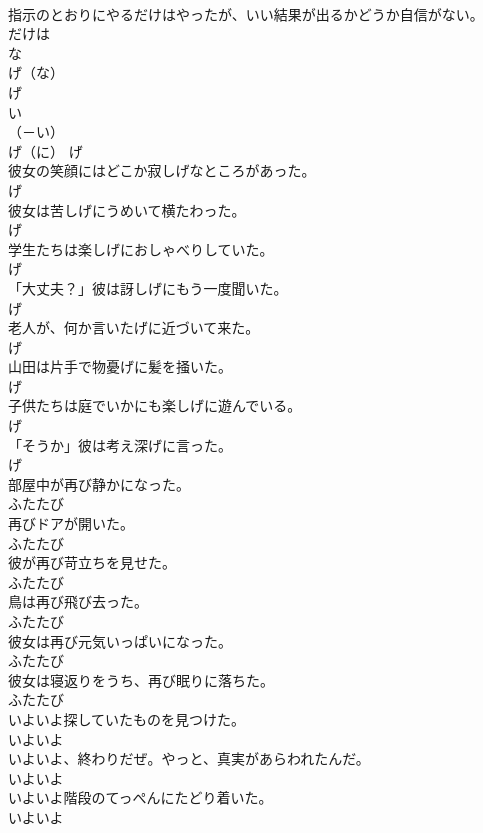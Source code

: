 \documentclass[8pt]{extreport}
\begin{document}
\begin{CJK}{UTF8}{min}
\\	指示のとおりにやるだけはやったが、いい結果が出るかどうか自信がない。	
\\	だけは
\\	な
\\	げ（な）	
\\	げ	
\\	い
\\	（－い） 
\\	げ（に）	げ
\\	彼女の笑顔にはどこか寂しげなところがあった。	
\\	げ
\\	彼女は苦しげにうめいて横たわった。	
\\	げ
\\	学生たちは楽しげにおしゃべりしていた。	
\\	げ
\\	「大丈夫？」彼は訝しげにもう一度聞いた。	
\\	げ
\\	老人が、何か言いたげに近づいて来た。	
\\	げ
\\	山田は片手で物憂げに髪を掻いた。	
\\	げ
\\	子供たちは庭でいかにも楽しげに遊んでいる。	
\\	げ
\\	「そうか」彼は考え深げに言った。	
\\	げ
\\	部屋中が再び静かになった。	
\\	ふたたび
\\	再びドアが開いた。	
\\	ふたたび
\\	彼が再び苛立ちを見せた。	
\\	ふたたび
\\	鳥は再び飛び去った。	
\\	ふたたび
\\	彼女は再び元気いっぱいになった。	
\\	ふたたび
\\	彼女は寝返りをうち、再び眠りに落ちた。	
\\	ふたたび
\\	いよいよ探していたものを見つけた。	
\\	いよいよ
\\	いよいよ、終わりだぜ。やっと、真実があらわれたんだ。	
\\	いよいよ
\\	いよいよ階段のてっぺんにたどり着いた。	
\\	いよいよ

\end{CJK}
\end{document}
